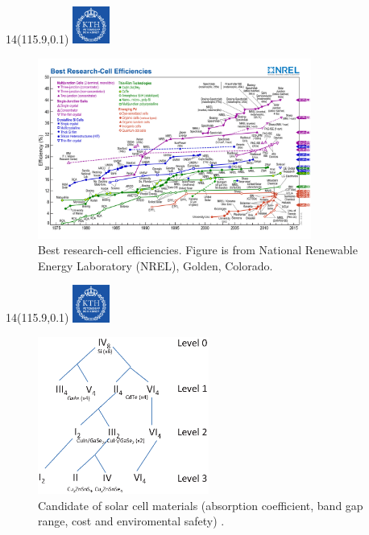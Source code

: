 \documentclass[]{beamer}
\newcommand{\MyLogo}{%
\begin{textblock}{14}(115.9,0.1)
  \includegraphics[width=1.22cm]{kth_rgb}
 \end{textblock}
}
\begin{document}
\begin{frame}
\MyLogo
\begin{figure}[H]
\centering
\includegraphics[width=0.8\textwidth]{efficiency_chart.jpg}
\caption{Best research-cell efficiencies. Figure is from National Renewable Energy Laboratory (NREL), Golden, Colorado.}
\label{nrel}
\end{figure}
\end{frame}

\begin{frame}
\MyLogo

\begin{figure}[H]
\centering
\includegraphics[width=0.5\textwidth,clip]{compoundsemicondctor1} 
\caption{Candidate of solar cell materials (absorption
coefficient, band gap range, cost and enviromental safety) .}
\label{compoundsemicondctor1}
\end{figure}
\end{frame}
\end{document}
